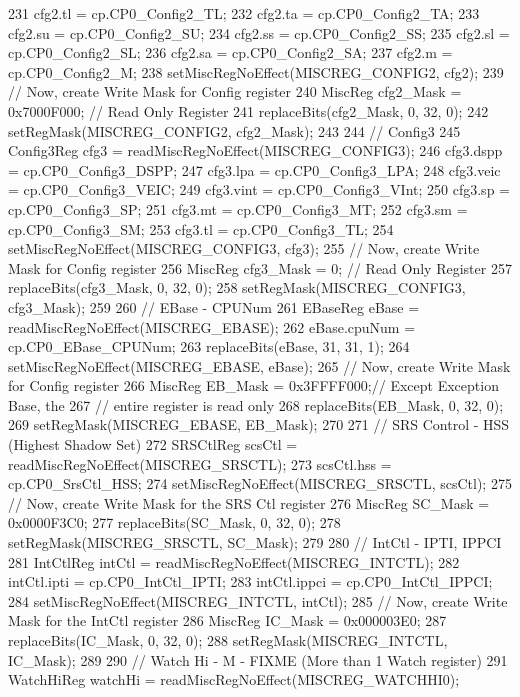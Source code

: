 \begin{DoxyCode}
{231     cfg2.tl = cp.CP0_Config2_TL;
232     cfg2.ta = cp.CP0_Config2_TA;
233     cfg2.su = cp.CP0_Config2_SU;
234     cfg2.ss = cp.CP0_Config2_SS;
235     cfg2.sl = cp.CP0_Config2_SL;
236     cfg2.sa = cp.CP0_Config2_SA;
237     cfg2.m = cp.CP0_Config2_M;
238     setMiscRegNoEffect(MISCREG_CONFIG2, cfg2);
239     // Now, create Write Mask for Config register
240     MiscReg cfg2_Mask = 0x7000F000; // Read Only Register
241     replaceBits(cfg2_Mask, 0, 32, 0);
242     setRegMask(MISCREG_CONFIG2, cfg2_Mask);
243 
244     // Config3
245     Config3Reg cfg3 = readMiscRegNoEffect(MISCREG_CONFIG3);
246     cfg3.dspp = cp.CP0_Config3_DSPP;
247     cfg3.lpa = cp.CP0_Config3_LPA;
248     cfg3.veic = cp.CP0_Config3_VEIC;
249     cfg3.vint = cp.CP0_Config3_VInt;
250     cfg3.sp = cp.CP0_Config3_SP;
251     cfg3.mt = cp.CP0_Config3_MT;
252     cfg3.sm = cp.CP0_Config3_SM;
253     cfg3.tl = cp.CP0_Config3_TL;
254     setMiscRegNoEffect(MISCREG_CONFIG3, cfg3);
255     // Now, create Write Mask for Config register
256     MiscReg cfg3_Mask = 0; // Read Only Register
257     replaceBits(cfg3_Mask, 0, 32, 0);
258     setRegMask(MISCREG_CONFIG3, cfg3_Mask);
259 
260     // EBase - CPUNum
261     EBaseReg eBase = readMiscRegNoEffect(MISCREG_EBASE);
262     eBase.cpuNum = cp.CP0_EBase_CPUNum;
263     replaceBits(eBase, 31, 31, 1);
264     setMiscRegNoEffect(MISCREG_EBASE, eBase);
265     // Now, create Write Mask for Config register
266     MiscReg EB_Mask = 0x3FFFF000;// Except Exception Base, the
267                                  // entire register is read only
268     replaceBits(EB_Mask, 0, 32, 0);
269     setRegMask(MISCREG_EBASE, EB_Mask);
270 
271     // SRS Control - HSS (Highest Shadow Set)
272     SRSCtlReg scsCtl = readMiscRegNoEffect(MISCREG_SRSCTL);
273     scsCtl.hss = cp.CP0_SrsCtl_HSS;
274     setMiscRegNoEffect(MISCREG_SRSCTL, scsCtl);
275     // Now, create Write Mask for the SRS Ctl register
276     MiscReg SC_Mask = 0x0000F3C0;
277     replaceBits(SC_Mask, 0, 32, 0);
278     setRegMask(MISCREG_SRSCTL, SC_Mask);
279 
280     // IntCtl - IPTI, IPPCI
281     IntCtlReg intCtl = readMiscRegNoEffect(MISCREG_INTCTL);
282     intCtl.ipti = cp.CP0_IntCtl_IPTI;
283     intCtl.ippci = cp.CP0_IntCtl_IPPCI;
284     setMiscRegNoEffect(MISCREG_INTCTL, intCtl);
285     // Now, create Write Mask for the IntCtl register
286     MiscReg IC_Mask = 0x000003E0;
287     replaceBits(IC_Mask, 0, 32, 0);
288     setRegMask(MISCREG_INTCTL, IC_Mask);
289 
290     // Watch Hi - M - FIXME (More than 1 Watch register)
291     WatchHiReg watchHi = readMiscRegNoEffect(MISCREG_WATCHHI0);
}
\end{DoxyCode}
